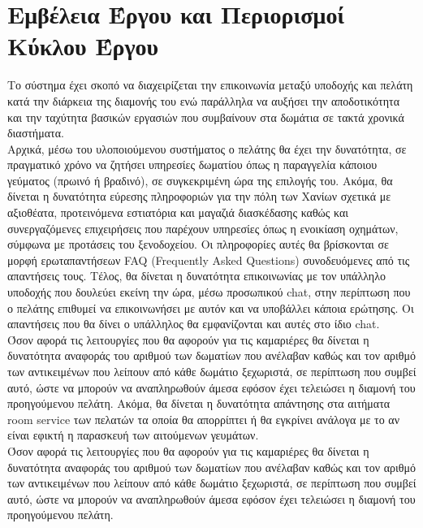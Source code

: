 \section{Εμβέλεια Έργου και Περιορισμοί Κύκλου Έργου}		
Το σύστημα έχει σκοπό να διαχειρίζεται την επικοινωνία μεταξύ υποδοχής και πελάτη κατά την διάρκεια 
της διαμονής του ενώ παράλληλα να αυξήσει την αποδοτικότητα και την ταχύτητα βασικών εργασιών 
που συμβαίνουν στα δωμάτια σε τακτά χρονικά διαστήματα.\\

\noindent
Αρχικά, μέσω του υλοποιούμενου συστήματος ο πελάτης θα έχει την δυνατότητα, σε πραγματικό χρόνο
να ζητήσει υπηρεσίες δωματίου όπως η παραγγελία κάποιου γεύματος (πρωινό ή βραδινό), σε 
συγκεκριμένη ώρα της επιλογής του. Ακόμα, θα δίνεται η δυνατότητα εύρεσης πληροφοριών για την πόλη
των Χανίων σχετικά με αξιοθέατα, προτεινόμενα εστιατόρια και μαγαζιά διασκέδασης καθώς και  
συνεργαζόμενες επιχειρήσεις που παρέχουν υπηρεσίες όπως η ενοικίαση οχημάτων, σύμφωνα με 
προτάσεις του ξενοδοχείου. Οι πληροφορίες αυτές θα βρίσκονται σε μορφή ερωταπαντήσεων FAQ 
(Frequently Asked Questions) συνοδευόμενες από τις  απαντήσεις τους. Τέλος, θα δίνεται η δυνατότητα 
επικοινωνίας με τον υπάλληλο υποδοχής που δουλεύει εκείνη την ώρα, μέσω προσωπικού chat, στην 
περίπτωση που ο πελάτης επιθυμεί να επικοινωνήσει με αυτόν και να υποβάλλει κάποια ερώτησης. Οι 
απαντήσεις που θα δίνει ο υπάλληλος θα  εμφανίζονται και αυτές στο ίδιο chat. \\

\noindent
Όσον αφορά τις λειτουργίες που θα αφορούν για τις καμαριέρες θα δίνεται η δυνατότητα αναφοράς του
αριθμού των δωματίων που ανέλαβαν καθώς και τον αριθμό των αντικειμένων που λείπουν από κάθε 
δωμάτιο ξεχωριστά, σε περίπτωση που συμβεί αυτό, ώστε να μπορούν να αναπληρωθούν άμεσα εφόσον 
έχει τελειώσει η διαμονή του προηγούμενου πελάτη.  Ακόμα, θα δίνεται η δυνατότητα απάντησης στα
αιτήματα room service  των πελατών τα οποία θα απορρίπτει ή θα εγκρίνει ανάλογα με το αν είναι εφικτή
η παρασκευή των αιτούμενων γευμάτων.\\

\noindent
Όσον αφορά τις λειτουργίες που θα αφορούν για τις καμαριέρες θα δίνεται η δυνατότητα αναφοράς του
αριθμού των δωματίων που ανέλαβαν καθώς και τον αριθμό των αντικειμένων που λείπουν από κάθε 
δωμάτιο ξεχωριστά, σε περίπτωση που συμβεί αυτό, ώστε να μπορούν να αναπληρωθούν άμεσα εφόσον 
έχει τελειώσει η διαμονή του προηγούμενου πελάτη. \\


